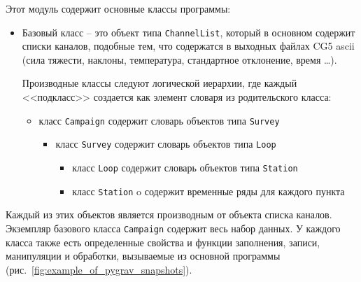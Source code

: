 Этот модуль содержит основные классы программы:
\begin{itemize}
    \item Базовый класс -- это объект типа \verb|ChannelList|, который в основном
    содержит списки каналов, подобные тем, что содержатся в выходных файлах CG5
    ascii (сила тяжести, наклоны, температура, стандартное отклонение, время
    \dots).

    Производные классы следуют логической иерархии, где каждый <<подкласс>>
    создается как элемент словаря из родительского класса:
    \begin{itemize}
        \item класс \verb|Campaign| содержит словарь объектов типа \verb|Survey|
        \begin{itemize}
            \item класс \verb|Survey| содержит словарь объектов типа \verb|Loop|
            \begin{itemize}
                \item класс \verb|Loop| содержит словарь объектов типа \verb|Station|
                    \item класс \verb|Station| o содержит временные ряды для каждого пункта 
            \end{itemize}
        \end{itemize}
    \end{itemize}
    
\end{itemize}

Каждый из этих объектов является производным от объекта списка каналов.
Экземпляр базового класса \verb|Campaign| содержит весь набор данных. У каждого
класса также есть определенные свойства и функции заполнения, записи, манипуляции
и обработки, вызываемые из основной программы (рис.~\ref{fig:example_of_pygrav_snapshots}).

